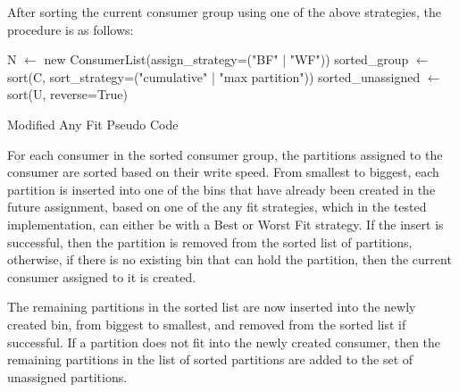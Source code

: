 After sorting the current consumer group using one of the above strategies, the
    procedure is as follows:

\IncMargin{1em} \begin{algorithm}[h]
       \BlankLine N $\leftarrow$ new
    ConsumerList(assign\_strategy=("BF" | "WF"))\; sorted\_group $\leftarrow$
    sort(C, sort\_strategy=("cumulative" | "max partition"))\; 
    sorted\_unassigned $\leftarrow$ sort(U, reverse=True)\;   \caption{Modified
Any Fit Pseudo Code}\label{algo:MBPP} \end{algorithm}\DecMargin{1em}


For each consumer in the sorted consumer group, the partitions assigned to the
    consumer are sorted based on their write speed. From smallest to biggest,
    each partition is inserted into one of the bins that have already been
    created in the future assignment, based on one of the any fit strategies,
    which in the tested implementation, can either be with a Best or Worst Fit
    strategy. If the insert is successful, then the partition is removed from
    the sorted list of partitions, otherwise, if there is no existing bin that
    can hold the partition, then the current consumer assigned to it is created. 

The remaining partitions in the sorted list are now inserted into the newly
created bin, from biggest to smallest, and removed from the sorted list if
successful. If a partition does not fit into the newly created consumer, then
the remaining partitions in the list of sorted partitions are added to the set
of unassigned partitions.

